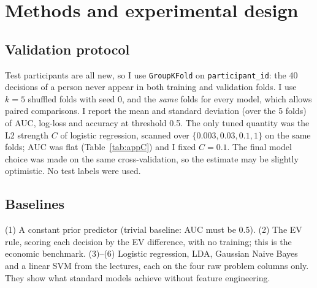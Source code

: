 \documentclass[11pt,a4paper]{article}
\begin{document}
\section{Methods and experimental design}
\subsection{Validation protocol}
Test participants are all new, so I use \texttt{GroupKFold} on \texttt{participant\_id}: the 40 decisions of a
person never appear in both training and validation folds. I use $k=5$ shuffled folds with seed 0, and the
\emph{same} folds for every model, which allows paired comparisons. I report the mean and standard deviation
(over the 5 folds) of AUC, log-loss and accuracy at threshold 0.5. The only tuned quantity was the
L2 strength $C$ of logistic regression, scanned over $\{0.003,0.03,0.1,1\}$ on the same folds; AUC was flat
(Table~\ref{tab:appC}) and I fixed $C=0.1$. The final model choice was made on the same cross-validation, so the
estimate may be slightly optimistic. No test labels were used.

\subsection{Baselines}
(1) A constant prior predictor (trivial baseline: AUC must be 0.5). (2) The EV rule, scoring each decision by
the EV difference, with no training; this is the economic benchmark. (3)--(6) Logistic regression, LDA, Gaussian
Naive Bayes and a linear SVM from the lectures, each on the four raw problem columns only. They show what
standard models achieve without feature engineering.
\end{document}
